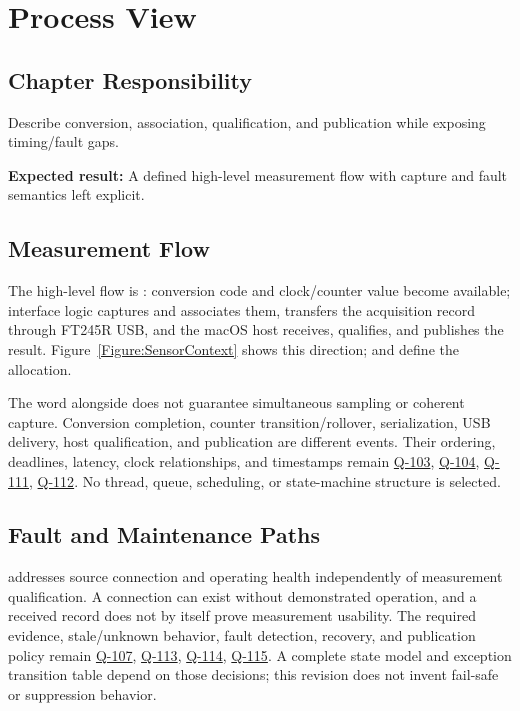 \chapter{Process View}
\section{Chapter Responsibility}
\label{Section:ProcessViewResponsibility}
Describe conversion, association, qualification, and publication while exposing timing/fault gaps.

\noindent\textbf{Expected result:} A defined high-level measurement flow with capture and fault semantics left explicit.

\section{Measurement Flow}
The high-level flow is : conversion code and clock/counter value become available; interface logic captures and associates them, transfers the acquisition record through FT245R USB, and the macOS host receives, qualifies, and publishes the result. Figure~\ref{Figure:SensorContext} shows this direction;  and  define the allocation.

The word alongside does not guarantee simultaneous sampling or coherent capture. Conversion completion, counter transition/rollover, serialization, USB delivery, host qualification, and publication are different events. Their ordering, deadlines, latency, clock relationships, and timestamps remain \hyperref[Question:Q-103]{Q-103}, \hyperref[Question:Q-104]{Q-104}, \hyperref[Question:Q-111]{Q-111}, \hyperref[Question:Q-112]{Q-112}. No thread, queue, scheduling, or state-machine structure is selected.

\section{Fault and Maintenance Paths}
 addresses source connection and operating health independently of measurement qualification. A connection can exist without demonstrated operation, and a received record does not by itself prove measurement usability. The required evidence, stale/unknown behavior, fault detection, recovery, and publication policy remain \hyperref[Question:Q-107]{Q-107}, \hyperref[Question:Q-113]{Q-113}, \hyperref[Question:Q-114]{Q-114}, \hyperref[Question:Q-115]{Q-115}. A complete state model and exception transition table depend on those decisions; this revision does not invent fail-safe or suppression behavior.
